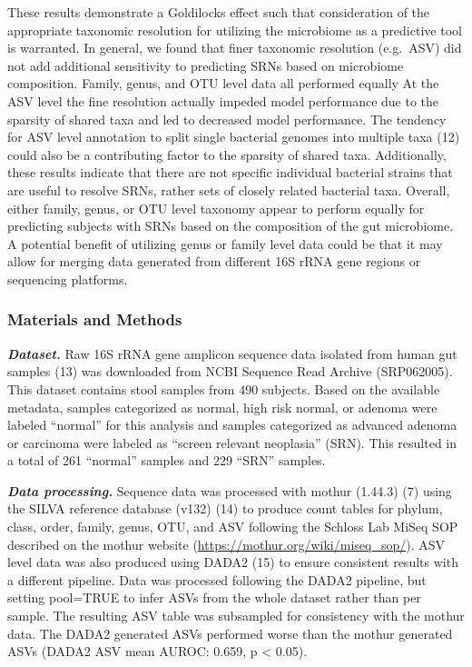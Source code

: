 \documentclass[
]{article}
\begin{document}
These results demonstrate a Goldilocks effect such that consideration of
the appropriate taxonomic resolution for utilizing the microbiome as a
predictive tool is warranted. In general, we found that finer taxonomic
resolution (e.g.~ASV) did not add additional sensitivity to predicting
SRNs based on microbiome composition. Family, genus, and OTU level data
all performed equally At the ASV level the fine resolution actually
impeded model performance due to the sparsity of shared taxa and led to
decreased model performance. The tendency for ASV level annotation to
split single bacterial genomes into multiple taxa (12) could also be a
contributing factor to the sparsity of shared taxa. Additionally, these
results indicate that there are not specific individual bacterial
strains that are useful to resolve SRNs, rather sets of closely related
bacterial taxa. Overall, either family, genus, or OTU level taxonomy
appear to perform equally for predicting subjects with SRNs based on the
composition of the gut microbiome. A potential benefit of utilizing
genus or family level data could be that it may allow for merging data
generated from different 16S rRNA gene regions or sequencing platforms.

\hypertarget{materials-and-methods}{%
\subsubsection{Materials and Methods}\label{materials-and-methods}}

\textbf{\emph{Dataset.}} Raw 16S rRNA gene amplicon sequence data
isolated from human gut samples (13) was downloaded from NCBI Sequence
Read Archive (SRP062005). This dataset contains stool samples from 490
subjects. Based on the available metadata, samples categorized as
normal, high risk normal, or adenoma were labeled ``normal'' for this
analysis and samples categorized as advanced adenoma or carcinoma were
labeled as ``screen relevant neoplasia'' (SRN). This resulted in a total
of 261 ``normal'' samples and 229 ``SRN'' samples.

\textbf{\emph{Data processing.}} Sequence data was processed with mothur
(1.44.3) (7) using the SILVA reference database (v132) (14) to produce
count tables for phylum, class, order, family, genus, OTU, and ASV
following the Schloss Lab MiSeq SOP described on the mothur website
(\url{https://mothur.org/wiki/miseq_sop/}). ASV level data was also
produced using DADA2 (15) to ensure consistent results with a different
pipeline. Data was processed following the DADA2 pipeline, but setting
pool=TRUE to infer ASVs from the whole dataset rather than per sample.
The resulting ASV table was subsampled for consistency with the mothur
data. The DADA2 generated ASVs performed worse than the mothur generated
ASVs (DADA2 ASV mean AUROC: 0.659, p \textless{} 0.05).
\end{document}
